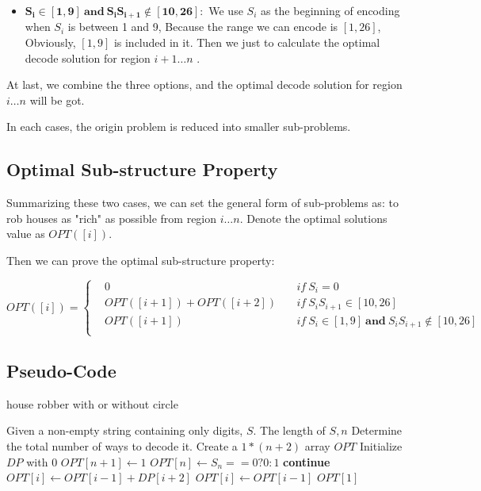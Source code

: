 \documentclass[UTF8,a4paper,12pt]{article}
\begin{document}
\begin{CJK}{UTF8}{gkai}
\begin{itemize}
			\item $\bm{ S_{i} \in [1,9]\ \textbf{and}\ S_{i}S_{i+1} \notin [10,26]  :}$ We use $ S_{i} $ as the beginning of encoding when $ S_{i} $ is between 1 and 9, Because the range we can encode is $ [1,26] $, Obviously, $ [1,9] $ is included in it. Then we just to calculate the optimal decode solution for region $ i+1 \dots n $ .
		\end{itemize}
	
		At last, we combine the three options, and the optimal decode solution for region $ i \dots n $ will be got.
	
		In each cases, the origin problem is reduced into smaller sub-problems.
	
	\subsection{Optimal Sub-structure Property}
	
		Summarizing these two cases, we can set the general form of sub-problems as: to rob houses as "rich" as possible from region $ i \dots n $. Denote the optimal solutions value as $ OPT([i]) $. 
		
		Then we can prove the optimal sub-structure property:
		
		$$ OPT([i]) = \left\{
		\begin{aligned}
			& 0 &&\ if\ S_{i}=0\\
			& OPT([i+1]) + OPT([i+2])	&&\ if\ S_{i}S_{i+1}\in[10,26]\\
			& OPT([i+1]) &&\ if\ S_{i} \in [1,9]\ \textbf{and} \ S_{i}S_{i+1} \notin [10,26]\\
		\end{aligned}
		\right.
		$$
	
	\subsection{Pseudo-Code}
	
	\begin{algorithm}[htb]
		\caption{house robber with or without circle}
		\begin{algorithmic}[1]
			\Require
				Given a non-empty string containing only digits, $ S $.
				The length of $ S, n $
			\Ensure
				Determine the total number of ways to decode it.
				\State Create a $ 1*(n+2) $ array $ OPT $
				\State Initialize $ DP $ with 0
				\State $ OPT[n+1] \gets 1 $
				\State $ OPT[n] \gets S_{n}==0?0:1 $
						\State \textbf{continue}
						\State $ OPT[i] \gets OPT[i-1]+DP[i+2] $
					\Else
						\State $ OPT[i] \gets OPT[i-1] $
					\EndIf
				\EndFor
				\State \Return $ OPT[1] $
			\EndFunction
			\State
		\end{algorithmic}
	\end{algorithm}
	


\end{CJK}
\end{document}
